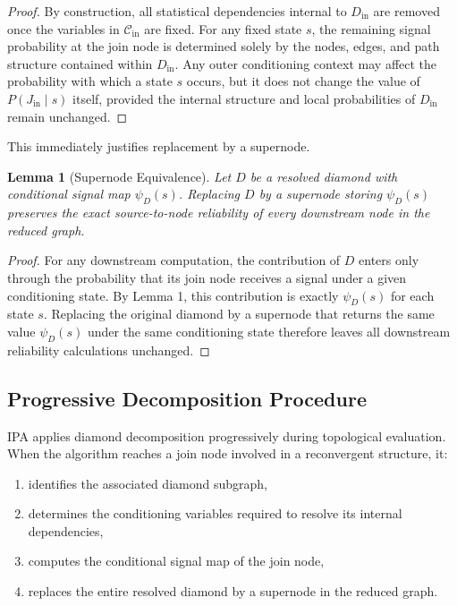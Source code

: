 \documentclass[preprint,12pt]{elsarticle}
\newtheorem{lemma}{Lemma}[section]
\begin{document}
\begin{proof}
By construction, all statistical dependencies internal to $D_{\mathrm{in}}$ are removed once the variables in $\mathcal{C}_{\mathrm{in}}$ are fixed. For any fixed state $s$, the remaining signal probability at the join node is determined solely by the nodes, edges, and path structure contained within $D_{\mathrm{in}}$. Any outer conditioning context may affect the probability with which a state $s$ occurs, but it does not change the value of $P(J_{\mathrm{in}} \mid s)$ itself, provided the internal structure and local probabilities of $D_{\mathrm{in}}$ remain unchanged.
\end{proof}

This immediately justifies replacement by a supernode.

\begin{lemma}[Supernode Equivalence]
Let $D$ be a resolved diamond with conditional signal map $\psi_D(s)$. Replacing $D$ by a supernode storing $\psi_D(s)$ preserves the exact source-to-node reliability of every downstream node in the reduced graph.
\end{lemma}

\begin{proof}
For any downstream computation, the contribution of $D$ enters only through the probability that its join node receives a signal under a given conditioning state. By Lemma 1, this contribution is exactly $\psi_D(s)$ for each state $s$. Replacing the original diamond by a supernode that returns the same value $\psi_D(s)$ under the same conditioning state therefore leaves all downstream reliability calculations unchanged.
\end{proof}

\subsection{Progressive Decomposition Procedure}

IPA applies diamond decomposition progressively during topological evaluation. When the algorithm reaches a join node involved in a reconvergent structure, it:
\begin{enumerate}
    \item identifies the associated diamond subgraph,
    \item determines the conditioning variables required to resolve its internal dependencies,
    \item computes the conditional signal map of the join node,
    \item replaces the entire resolved diamond by a supernode in the reduced graph.
\end{enumerate}
\end{document}
